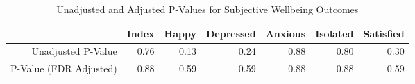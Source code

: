 \begin{table}[ht]
\centering
\caption{Unadjusted and Adjusted P-Values for Subjective Wellbeing Outcomes} 
\begin{tabular}{rrrrrrr}
  \hline
 & Index & Happy & Depressed & Anxious & Isolated & Satisfied \\ 
  \hline
Unadjusted P-Value & 0.76 & 0.13 & 0.24 & 0.88 & 0.80 & 0.30 \\ 
  P-Value (FDR Adjusted) & 0.88 & 0.59 & 0.59 & 0.88 & 0.88 & 0.59 \\ 
   \hline
\end{tabular}
\end{table}
